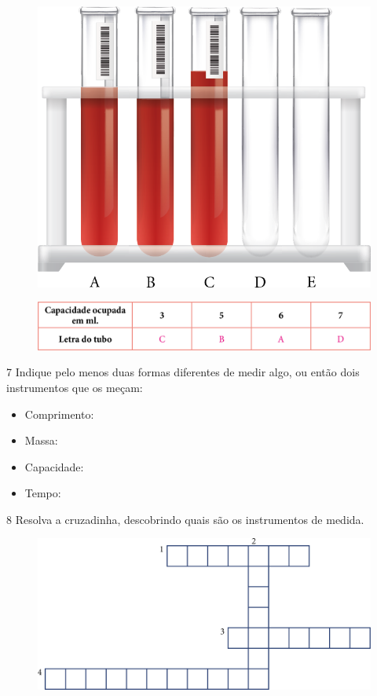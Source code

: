 \begin{figure}[htpb!]
\centering\includegraphics[width=.4\textwidth]{./media/image36.png}
\end{figure}

\begin{figure}[htpb!]
\includegraphics[width=\textwidth]{./media/image37.png}
\end{figure}

\pagebreak

\num{7} Indique pelo menos duas formas diferentes de medir algo, ou então dois
instrumentos que os meçam:

\begin{itemize}
\item Comprimento:

\item Massa:

\item Capacidade:

\item Tempo:
\end{itemize}

\num{8} Resolva a cruzadinha, descobrindo quais são os instrumentos de medida.

\begin{figure}[htpb!]
\includegraphics[width=\textwidth]{./media/image38.png}
\end{figure}

